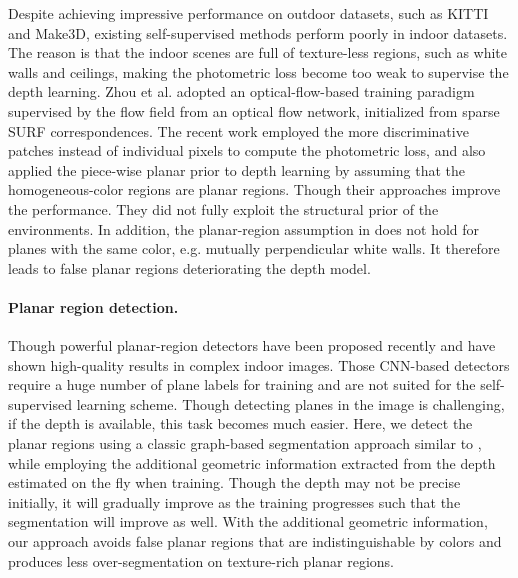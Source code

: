 \documentclass[10pt,twocolumn,letterpaper]{article}
\begin{document}
Despite achieving impressive performance on outdoor datasets, such as KITTI\cite{geiger2012we} and Make3D\cite{saxena2008make3d}, existing self-supervised methods perform poorly in indoor datasets. The reason is that the indoor scenes are full of texture-less regions, such as white walls and ceilings, making the photometric loss become too weak to supervise the depth learning.
Zhou et al.\cite{zhou2019moving} adopted an optical-flow-based training paradigm supervised by the flow field from an optical flow network, initialized from sparse SURF \cite{bay2006surf} correspondences. The recent work \cite{yu2020p} employed the more discriminative patches instead of individual pixels to compute the photometric loss, and also applied the piece-wise planar prior to depth learning by assuming that the homogeneous-color regions are planar regions.
Though their approaches improve the performance. They did not fully exploit the structural prior of the environments. In addition, the planar-region assumption in \cite{yu2020p} does not hold for planes with the same color, e.g. mutually perpendicular white walls. It therefore leads to false planar regions deteriorating the depth model.

\paragraph{Planar region detection.}
Though powerful planar-region detectors \cite{liu2019planercnn}\cite{yang2018every}\cite{yu2019single} have been proposed recently and have shown high-quality results in complex indoor images. Those CNN-based detectors require a huge number of plane labels for training and are not suited for the self-supervised learning scheme. Though detecting planes in the image is challenging, if the depth is available, this task becomes much easier\cite{salas2014dense}\cite{kim2018linear}. 
Here, we detect the planar regions using a classic graph-based segmentation approach \cite{felzenszwalb2004efficient} similar to \cite{yu2020p}, while employing the additional geometric information extracted from the depth estimated on the fly when training. Though the depth may not be precise initially, it will gradually improve as the training progresses such that the segmentation will improve as well.
With the additional geometric information, our approach avoids false planar regions that are indistinguishable by colors and produces less over-segmentation on texture-rich planar regions.
\end{document}
